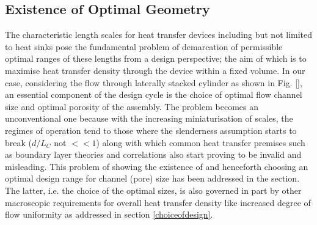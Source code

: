 \documentclass[twocolumn,10pt,cleanfoot]{ihmtc}
\begin{document}
\subsection{Existence of Optimal Geometry}\label{existence_dopt}
The characteristic length scales for heat transfer devices including but not limited to heat sinks pose the fundamental problem of demarcation of permissible optimal ranges of these lengths from a design perspective; the aim of which is to maximise heat transfer density through the device within a fixed volume. In our case, considering the flow through laterally stacked cylinder as shown in Fig. \ref{}, an essential component of the design cycle is the choice of  optimal flow channel size and optimal porosity of the assembly. The problem becomes an unconventional one because with the increasing miniaturisation of scales, the regimes of operation tend to those where the slenderness assumption starts to break ($d/L_C$ not $<< 1$) along with which common heat transfer premises such as boundary layer theories and correlations also start proving to be invalid and misleading. This problem of showing the existence of and henceforth choosing an optimal design range for channel (pore) size has been addressed in the section. The latter, i.e. the choice of the optimal sizes, is also governed in part by other macroscopic requirements for overall heat transfer density like increased degree of flow uniformity as addressed in section \ref{choiceofdesign}.
\end{document}
